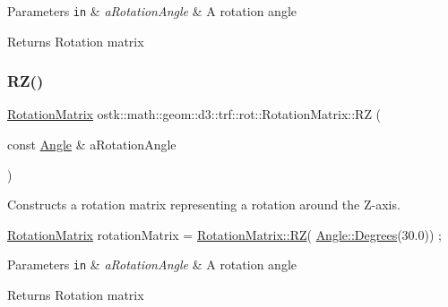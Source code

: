 \begin{DoxyParams}[1]{Parameters}
\mbox{\tt in}  & {\em a\+Rotation\+Angle} & A rotation angle \\
\hline
\end{DoxyParams}
\begin{DoxyReturn}{Returns}
Rotation matrix 
\end{DoxyReturn}
\mbox{\label{classostk_1_1math_1_1geom_1_1d3_1_1trf_1_1rot_1_1_rotation_matrix_aef0a548981c37f3f7c8c53fec3f5e04e}} 
\subsubsection{\texorpdfstring{R\+Z()}{RZ()}}
{\footnotesize\ttfamily \hyperlink{classostk_1_1math_1_1geom_1_1d3_1_1trf_1_1rot_1_1_rotation_matrix}{Rotation\+Matrix} ostk\+::math\+::geom\+::d3\+::trf\+::rot\+::\+Rotation\+Matrix\+::\+RZ (\begin{DoxyParamCaption}\item[{const \hyperlink{classostk_1_1math_1_1geom_1_1_angle}{Angle} \&}]{a\+Rotation\+Angle }\end{DoxyParamCaption})\hspace{0.3cm}{\ttfamily [static]}}



Constructs a rotation matrix representing a rotation around the Z-\/axis. 


\begin{DoxyCode}
\hyperlink{classostk_1_1math_1_1geom_1_1d3_1_1trf_1_1rot_1_1_rotation_matrix_a5e6bed0779ad7db0c5bf26b2bd96f8ba}{RotationMatrix} rotationMatrix = \hyperlink{classostk_1_1math_1_1geom_1_1d3_1_1trf_1_1rot_1_1_rotation_matrix_aef0a548981c37f3f7c8c53fec3f5e04e}{RotationMatrix::RZ}(
      \hyperlink{classostk_1_1math_1_1geom_1_1_angle_a2cefda601167af07f61f0477776203ca}{Angle::Degrees}(30.0)) ;
\end{DoxyCode}



\begin{DoxyParams}[1]{Parameters}
\mbox{\tt in}  & {\em a\+Rotation\+Angle} & A rotation angle \\
\hline
\end{DoxyParams}
\begin{DoxyReturn}{Returns}
Rotation matrix 
\end{DoxyReturn}
\mbox{\label{classostk_1_1math_1_1geom_1_1d3_1_1trf_1_1rot_1_1_rotation_matrix_a10bcc350ae896982a0939afe1234a86a}} 
